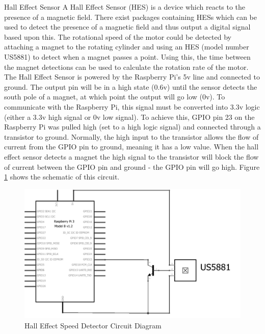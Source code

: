 \documentclass[twoside,a4]{report}
\def\br{\newline \newline \noindent}
\begin{document}
\large Hall Effect Sensor \normalsize \br
A Hall Effect Sensor (HES) is a device which reacts to the presence of a magnetic field. There exist packages containing HESs which can be used to detect the presence of a magnetic field and thus output a digital signal based upon this. The rotational speed of the motor could be detected by attaching a magnet to the rotating cylinder and using an HES (model number US5881) to detect when a magnet passes a point. Using this, the time between the magnet detections can be used to calculate the rotation rate of the motor. \br
The Hall Effect Sensor is powered by the Raspberry Pi's 5v line and connected to ground. The output pin will be in a high state (0.6v) until the sensor detects the south pole of a magnet, at which point the output will go low (0v). To communicate with the Raspberry Pi, this signal must be converted into 3.3v logic (either a 3.3v high signal or 0v low signal). To achieve this, GPIO pin 23 on the Raspberry Pi was pulled high (set to a high logic signal) and connected through a transistor to ground. Normally, the high input to the transistor allows the flow of current from the GPIO pin to ground, meaning it has a low value. When the hall effect sensor detects a magnet the high signal to the transistor will block the flow of current between the GPIO pin and ground - the GPIO pin will go high. Figure \ref{circhall} shows the schematic of this circuit. \newline
\begin{figure}[!htb]
	\centering
	\includegraphics[scale=0.3]{images/circspeeddet.png}
	\caption{Hall Effect Speed Detector Circuit Diagram}
	\label{circhall}
\end{figure} \newline  \noindent
\end{document}
